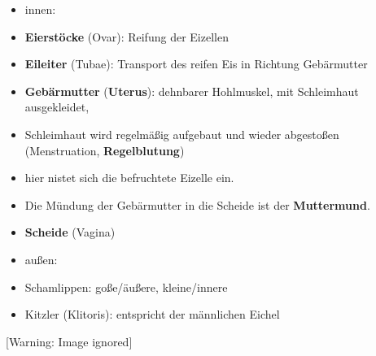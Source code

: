 \documentclass{article}
\newcommand\gEs[1]{\textbf{\textcolor[rgb]{0.0,0.0,0.5019608}{#1}}}
\newcommand\gEs[1]{\textbf{\textcolor[rgb]{0.0,0.0,0.5019608}{#1}}}
\newcommand\gT[1]{\textbf{\textup{\textcolor[rgb]{0.0,0.5019608,0.0}{#1}}}}
\begin{document}
\begin{itemize}
\item {\mdseries
innen:}

\end{itemize}
\begin{itemize}
\item {\mdseries
\gEs{Eierst\"ocke} (Ovar): Reifung der Eizellen}

\item {\mdseries
\gEs{Eileiter} (Tubae): Transport des reifen Eis in
Richtung Geb\"armutter}

\item {\mdseries
\gEs{Geb\"armutter}
(\gT{Uterus}): dehnbarer Hohlmuskel, mit
Schleimhaut ausgekleidet, }

\end{itemize}
\begin{itemize}
\item {\mdseries
Schleimhaut wird regelm\"a{\ss}ig aufgebaut und wieder abgesto{\ss}en
(Menstruation, \gEs{Regelblutung})}

\item {\mdseries
hier nistet sich die befruchtete Eizelle ein. }

\item {\mdseries
Die M\"undung der Geb\"armutter in die Scheide ist der
\gT{Muttermund}. }

\end{itemize}
\begin{itemize}
\item {\mdseries
\gEs{Scheide} (Vagina)}

\end{itemize}
\begin{itemize}
\item {\mdseries
au{\ss}en: }

\end{itemize}
\begin{itemize}
\item {\mdseries
Schamlippen: go{\ss}e/\"au{\ss}ere, kleine/innere}

\item {\mdseries
Kitzler (Klitoris): entspricht der m\"annlichen Eichel}

\end{itemize}
  [Warning: Image ignored] %
 
\end{document}
